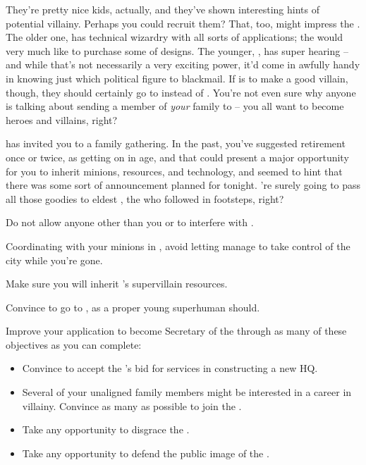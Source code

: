 \documentclass[char]{LRSguildcamp1}
\begin{document}
They're pretty nice kids, actually, and they've shown interesting hints of potential villainy.  Perhaps you could recruit them?  That, too, might impress the \cVillainCompact{}.  The older one, \cTeen{} has technical wizardry with all sorts of applications; the \cVillainCompact{} would very much like to purchase some of \cTeen{\their} designs.  The younger, \cTween{}, has super hearing -- and while that's not necessarily a very exciting power, it'd come in awfully handy in knowing just which political figure to blackmail.  If \cTween{} is to make a good villain, though, they should certainly go to \pSuperSchool{} instead of \pNormalSchool{}.  You're not even sure why anyone is talking about sending a member of {\em your} family to \pNormalSchool{} -- you all want to become heroes and villains, right?

\cGrandma{} has invited you to a family gathering.  In the past, you've suggested retirement once or twice, as \cGrandma{\theyare} getting on in age, and that could present a major opportunity for you to inherit \cGrandma{\their} minions, resources, and technology, and \cGrandma{} seemed to hint that there was some sort of announcement planned for tonight.  \cGrandma{\They}'re surely going to pass all those goodies to \cGrandma{\their} eldest \cOldest{\offspring}, the \cOldest{\villain} who followed in \cGrandma{\their} footsteps, right?

\begin{itemz}[Goals]
	\item Do not allow anyone other than you or \cOS{} to interfere with \pCityO{}.  %
	\item Coordinating with your minions in \pCityO{}, avoid letting \cOS{} manage to take control of the city while you're gone.
	\item Make sure you will inherit \cGrandma{}'s supervillain resources. %
	\item Convince \cTween{} to go to \pSuperSchool{}, as a proper young superhuman should.
	\item Improve your application to become Secretary of the \cVillainCompact{\intro} through as many of these objectives as you can complete:
	\begin{itemize}
		\item Convince \cArchitect{} to accept the \cVillainCompact{}'s bid for \cArchitect{\their} services in constructing a new HQ.
		\item Several of your unaligned family members might be interested in a career in villainy.  Convince as many as possible to join the \cVillainCompact{\intro}.
		\item Take any opportunity to disgrace the \cHeroLeague{\intro}.
		\item Take any opportunity to defend the public image of the \cVillainCompact{}.  %
	\end{itemize}
\end{itemz}
\end{document}
